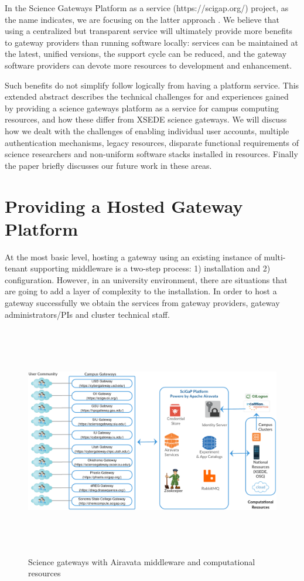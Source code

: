 \documentclass[sigconf]{acmart}
\begin{document}
In the Science Gateways Platform as a service (https://scigap.org/) project, as the name indicates, we are focusing on the latter approach \cite{pierce2015patching}. We believe that using a centralized but transparent service will ultimately provide more benefits to gateway providers than running software locally: services can be maintained at the latest, unified versions, the support cycle can be reduced, and the gateway software providers can devote more resources to development and enhancement.

Such benefits do not simplify follow logically from having a platform service. This extended abstract describes the technical challenges for and experiences gained by providing a science gateways platform as a service for campus computing resources, and how these differ from XSEDE science gateways. We will discuss how we dealt with the challenges of enabling individual user accounts, multiple authentication mechanisms, legacy resources, disparate functional requirements of science researchers and non-uniform software stacks installed in resources. Finally the paper briefly discusses our future work in these areas.

\section{Providing a Hosted Gateway Platform}
At the most basic level, hosting a gateway using an existing instance of multi-tenant supporting middleware is a two-step process: 1) installation and 2) configuration.  However, in an university environment, there are situations that are going to add a layer of complexity to the installation. In order to host a gateway successfully we obtain the services from gateway providers, gateway administrators/PIs and cluster technical staff.

\begin{figure}
\includegraphics[height=4in, width=7in]{figures/gateway_deployments.pdf}
\caption{Science gateways with Airavata middleware and computational resources}
\end{figure}
\end{document}
